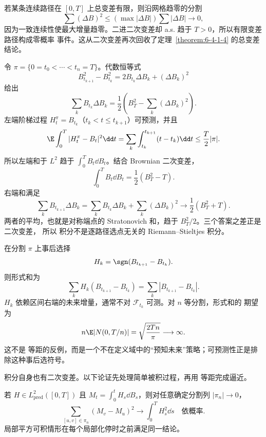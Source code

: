 若某条连续路径在 $[0,T]$ 上总变差有限，则沿网格趋零的分割
\[
 \sum(\Delta B)^2
 \le\left(\max|\Delta B|\right)\sum|\Delta B|\longrightarrow0,
\]
因为一致连续性使最大增量趋零。二进二次变差却 a.s. 趋于 $T>0$，所以有限变差路径构成零概率
事件。这从二次变差再次回收了定理~\ref{theorem:6-4-1-4} 的总变差结论。

\begin{example}\label{ex:6-4-2-2}
令 $\pi=\{0=t_0<\cdots<t_n=T\}$。代数恒等式
\[
 B_{t_{k+1}}^2-B_{t_k}^2
 =2B_{t_k}\Delta B_k+(\Delta B_k)^2
\]
给出
\[
 \sum_kB_{t_k}\Delta B_k
 =\frac12\left(B_T^2-\sum_k(\Delta B_k)^2\right).
\]
左端阶梯过程 $H_t^\pi=B_{t_k}$（$t_k<t\le t_{k+1}$）可预测，并且
\[
 \E\int_0^T|H_t^\pi-B_t|^2\dd t
 =\sum_k\int_{t_k}^{t_{k+1}}(t-t_k)\dd t
 \le\frac T2|\pi|.
\]
所以左端和于 $L^2$ 趋于 $\int_0^TB_t\dd B_t$。结合 Brownian 二次变差，
\[
 \int_0^TB_t\dd B_t=\frac12(B_T^2-T).
\]
右端和满足
\[
 \sum_kB_{t_{k+1}}\Delta B_k
 =\sum_kB_{t_k}\Delta B_k+\sum_k(\Delta B_k)^2
 \longrightarrow\frac12(B_T^2+T).
\]
两者的平均，也就是对称端点的 Stratonovich 和，趋于 $B_T^2/2$。三个答案之差正是二次变差，
所以 \Ito{} 积分不是逐路径选点无关的 Riemann--Stieltjes 积分。
\end{example}

\begin{example}[非适应被积过程]\label{ex:6-4-2-3}
在分割 $\pi$ 上事后选择
\[
 H_k=\sgn(B_{t_{k+1}}-B_{t_k}).
\]
则形式和为
\[
 \sum_kH_k(B_{t_{k+1}}-B_{t_k})=\sum_k|B_{t_{k+1}}-B_{t_k}|.
\]
$H_k$ 依赖区间右端的未来增量，通常不对 $\mathcal F_{t_k}$ 可测。对 $n$ 等分割，形式和的
期望为
\[
 n\E|N(0,T/n)|=\sqrt{\frac{2Tn}{\pi}}\longrightarrow\infty.
\]
这不是 \Ito{} 等距的反例，而是一个不在定义域中的“预知未来”策略；可预测性正是排除这种事后选符号。
\end{example}

\Ito{} 积分自身也有二次变差。以下论证先处理简单被积过程，再用 \Ito{} 等距完成逼近。

\begin{proposition}\label{proposition:6-4-2-4}
若 $H\in L^2_{\mathrm{pred}}([0,T])$ 且
$M_t=\int_0^tH_s\dd B_s$，则对任意确定分割列 $|\pi_n|\to0$，
\[
 \sum_{[u,v]\in\pi_n}(M_v-M_u)^2
 \longrightarrow\int_0^TH_s^2\dd s
 \quad\text{依概率}.
\]
局部平方可积情形在每个局部化停时之前满足同一结论。
\end{proposition}

